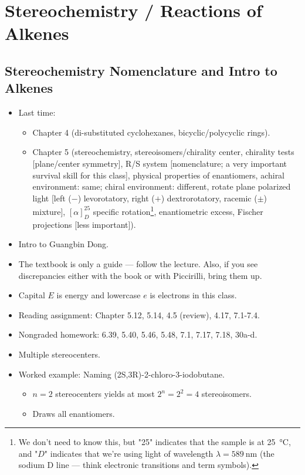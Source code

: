 \documentclass[../notes.tex]{subfiles}
\begin{document}
\chapter{Stereochemistry / Reactions of Alkenes}
\section{Stereochemistry Nomenclature and Intro to Alkenes}
\begin{itemize}
    \item {}Last time:
    \begin{itemize}
        \item Chapter 4 (di-substituted cyclohexanes, bicyclic/polycyclic rings).
        \item Chapter 5 (stereochemistry, stereoisomers/chirality center, chirality tests [plane/center symmetry], R/S system [nomenclature; a very important survival skill for this class], physical properties of enantiomers, achiral environment: same; chiral environment: different, rotate plane polarized light [left ($-$) levorotatory, right ($+$) dextrorotatory, racemic ($\pm$) mixture], $[\alpha]_D^{25}$ specific rotation\footnote{We don't need to know this, but "25" indicates that the sample is at \SI{25}{\celsius}, and "$D$" indicates that we're using light of wavelength $\lambda=\SI{589}{\nano\meter}$ (the sodium D line --- think electronic transitions and term symbols).}, enantiometric excess, Fischer projections [less important]).
    \end{itemize}
    \item Intro to Guangbin Dong.
    \item The textbook is only a guide --- follow the lecture. Also, if you see discrepancies either with the book or with Piccirilli, bring them up.
    \item Capital $E$ is energy and lowercase $e$ is electrons in this class.
    \item Reading assignment: Chapter 5.12, 5.14, 4.5 (review), 4.17, 7.1-7.4.
    \item Nongraded homework: 6.39, 5.40, 5.46, 5.48, 7.1, 7.17, 7.18, 30a-d.
    \item Multiple stereocenters.
    \item Worked example: Naming (2S,3R)-2-chloro-3-iodobutane.
    \begin{itemize}
        \item $n=2$ stereocenters yields at most $2^n=2^2=4$ stereoisomers.
        \item Draws all enantiomers.

\end{itemize}
\end{itemize}
\end{document}
